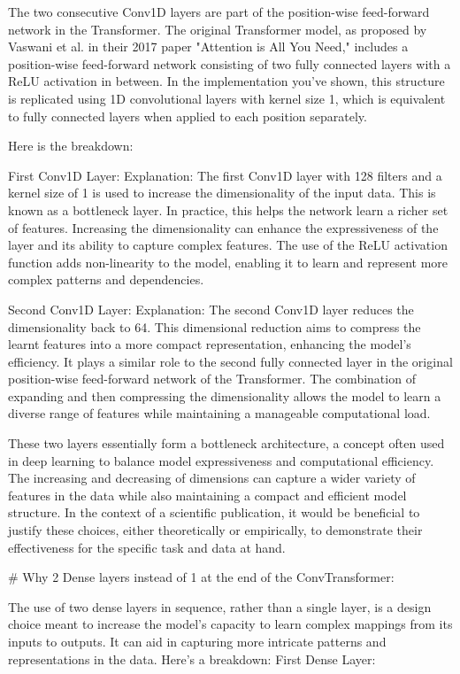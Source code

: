 The two consecutive Conv1D layers are part of the position-wise feed-forward network in the Transformer. The original Transformer model, as proposed by Vaswani et al. in their 2017 paper "Attention is All You Need," includes a position-wise feed-forward network consisting of two fully connected layers with a ReLU activation in between. In the implementation you've shown, this structure is replicated using 1D convolutional layers with kernel size 1, which is equivalent to fully connected layers when applied to each position separately.

Here is the breakdown:

    First Conv1D Layer:
        Explanation: The first Conv1D layer with 128 filters and a kernel size of 1 is used to increase the dimensionality of the input data. This is known as a bottleneck layer. In practice, this helps the network learn a richer set of features. Increasing the dimensionality can enhance the expressiveness of the layer and its ability to capture complex features. The use of the ReLU activation function adds non-linearity to the model, enabling it to learn and represent more complex patterns and dependencies.

    Second Conv1D Layer:
        Explanation: The second Conv1D layer reduces the dimensionality back to 64. This dimensional reduction aims to compress the learnt features into a more compact representation, enhancing the model's efficiency. It plays a similar role to the second fully connected layer in the original position-wise feed-forward network of the Transformer. The combination of expanding and then compressing the dimensionality allows the model to learn a diverse range of features while maintaining a manageable computational load.

These two layers essentially form a bottleneck architecture, a concept often used in deep learning to balance model expressiveness and computational efficiency. The increasing and decreasing of dimensions can capture a wider variety of features in the data while also maintaining a compact and efficient model structure. In the context of a scientific publication, it would be beneficial to justify these choices, either theoretically or empirically, to demonstrate their effectiveness for the specific task and data at hand.



# Why 2 Dense layers instead of 1 at the end of the ConvTransformer:

The use of two dense layers in sequence, rather than a single layer, is a design choice meant to increase the model's capacity to learn complex mappings from its inputs to outputs. It can aid in capturing more intricate patterns and representations in the data. Here’s a breakdown:
First Dense Layer:

